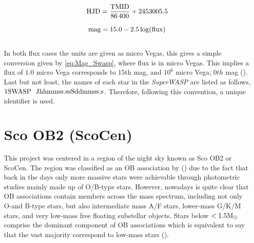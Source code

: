 \begingroup
\Large
\begin{equation}
 \textnormal{HJD} = \frac{\textnormal{TMID}}{86\,400} + 2453005.5 
 \label{eq:HJD_Swasp}
\end{equation}
\endgroup

\begingroup
\Large
\begin{equation}
 \textnormal{mag} = 15.0 - 2.5 \log(\textnormal{flux})
 \label{eq:Mag_Swasp}
\end{equation}
\endgroup \\

In both flux cases the units are given as micro Vegas, this gives a simple conversion given by \autoref{eq:Mag_Swasp}, where flux is in micro Vegas. This implies a flux of $1.0$ micro Vega corresponds to $15$th mag, and $10^6$ micro Vega; $0th$ mag  (\citeyear{2010A&A...520L..10B}). Last but not least, the names of each star in the \textit{SuperWASP} are listed as follows, $1\textnormal{SWASP}~~\textnormal{Jhhmmss.ssSddmmss.s}$. Therefore, following this convention, a unique identifier is used. 

\section{Sco OB2 (ScoCen)}\label{sec:ScoOB2}

This project was centered in a region of the night sky known as Sco OB2 or ScoCen. The region was classified as an OB association by  (\citeyear{Blaauw46}) due to the fact that back in the days only more massive stars were achievable through photometric studies mainly made up of O/B-type stars. However, nowadays is quite clear that OB associations contain members across the mass spectrum, including not only O-and B-type stars, but also intermediate mass A/F stars, lower-mass G/K/M stars, and very low-mass free floating substellar objects. Stars below $< 1.5 \textnormal{M}_\odot$ comprise the dominant component of OB associations which is equivalent to say that the vast majority correspond to low-mass stars  (\citeyear{2016MNRAS.461..794P}).\\


